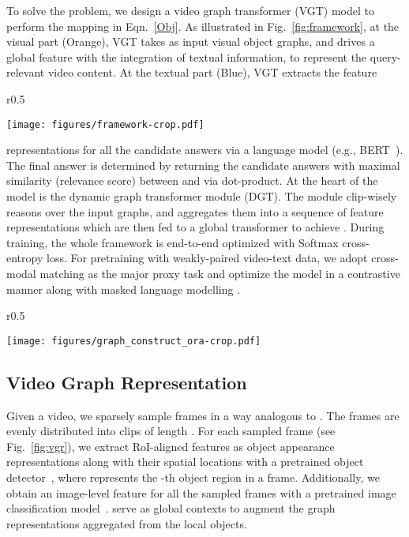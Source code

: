\documentclass[runningheads]{llncs}
\newcommand{\eg}{e.g.}
\begin{document}
To solve the problem, we design a video graph transformer (VGT) model to perform the mapping  in Eqn.~\eqref{Obj}. As illustrated in Fig.~\ref{fig:framework}, at the visual part (Orange), VGT takes as input visual object graphs, and drives a global feature  with the integration of textual information, to represent the query-relevant video content. At the textual part (Blue), VGT extracts the feature 
\begin{wrapfigure}[11]{r}{0.5\textwidth}
\vspace{-12pt}
  \begin{center}
    \texttt{[image: figures/framework-crop.pdf]}
  \end{center}
\vspace{-20pt}
  \caption{Overview of video graph transformer (VGT) for VideoQA.}
  \label{fig:framework}
\end{wrapfigure}
representations   for all the candidate answers via a language model (\eg, BERT~\cite{devlin2018bert}). The final answer  is determined by returning the candidate answers with maximal similarity (relevance score) between  and  via dot-product. At the heart of the model is the dynamic graph transformer module (DGT). The module clip-wisely reasons over the input graphs, and aggregates them into a sequence of feature representations  which are then fed to a global transformer to achieve . 
During training, the whole framework is end-to-end optimized with Softmax cross-entropy loss. For pretraining with weakly-paired video-text data, we adopt cross-modal matching as the major proxy task and optimize the model in a contrastive manner \cite{radford2021learning} along with masked language modelling \cite{devlin2018bert}.
 
\begin{wrapfigure}[11]{r}{0.5\textwidth}
\vspace{-32pt}
  \begin{center}
    \texttt{[image: figures/graph\_construct\_ora-crop.pdf]}
  \end{center}
\vspace{-20pt}
  \caption{Illustration of graph construction in a short video clip of  frames. The nodes of same color denote same object.}
  \label{fig:vgr}
\end{wrapfigure}
\subsection{Video Graph Representation}
\label{sec:vgr}
Given a video, we sparsely sample  frames in a way analogous to \cite{xiao2021video}. The  frames are evenly distributed into  clips of length .
For each sampled frame (see Fig.~\ref{fig:vgr}), we extract  RoI-aligned features as object appearance representations  along with their spatial locations  with a pretrained object detector~\cite{anderson2018bottom,ren2015faster}, where  represents the -th object region in a frame. Additionally, we obtain an image-level feature  for all the sampled frames with a pretrained image classification model~\cite{he2016deep}.  serve as global contexts to augment the graph representations aggregated from the local objects. 
\end{document}
